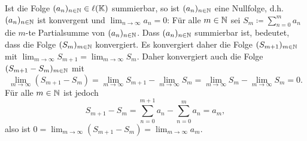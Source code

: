 \begin{bem}
 Ist die Folge $(a_n)_{n \in \mathbb{N}} \in \ell(\mathbb{K})$ summierbar, so ist $(a_n)_{n \in \mathbb{N}}$ eine Nullfolge, d.h.\ $(a_n)_{n \in \mathbb{N}}$ ist konvergent und $\lim_{n \to \infty} a_n = 0$: Für alle $m \in \mathbb{N}$ sei $S_m \coloneqq \sum_{n=0}^m a_n$ die $m$-te Partialsumme von $(a_n)_{n \in \mathbb{N}}$. Dass $(a_n)_{n \in \mathbb{N}}$ summierbar ist, bedeutet, dass die Folge $(S_m)_{m \in \mathbb{N}}$ konvergiert. Es konvergiert daher die Folge $(S_{m+1})_{m \in \mathbb{N}}$ mit $\lim_{m \to \infty} S_{m+1} = \lim_{m \to \infty} S_m$. Daher konvergiert auch die Folge $(S_{m+1} - S_m)_{m \in \mathbb{N}}$ mit
 \[
  \lim_{m \to \infty} (S_{m+1} - S_m)
  = \lim_{m \to \infty} S_{m+1} - \lim_{m \to \infty} S_m
  = \lim_{m \to \infty} S_m - \lim_{m \to \infty} S_m
  = 0.
 \]
 Für alle $m \in \mathbb{N}$ ist jedoch
 \[
  S_{m+1} - S_m
  = \sum_{n=0}^{m+1} a_n - \sum_{n=0}^m a_n
  = a_m,
 \]
 also ist $0 = \lim_{m \to \infty} (S_{m+1} - S_m) = \lim_{m \to \infty} a_m$.
\end{bem}




























